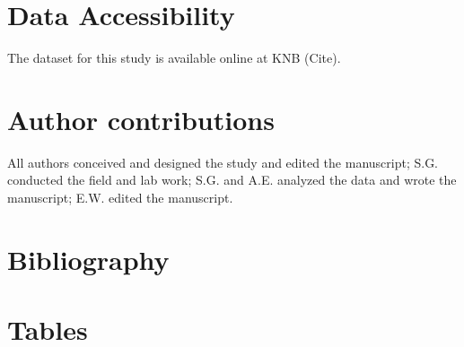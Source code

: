 \documentclass{article}
\begin{document}
\section*{Data Accessibility}
The dataset for this study is available online at KNB (Cite). 

\section*{Author contributions} All authors conceived and designed the study and edited the manuscript; S.G. conducted the field and lab work; S.G. and A.E. analyzed the data and wrote the manuscript; E.W. edited the manuscript.

\section{Bibliography}


\section* {Tables}
\end{document}
